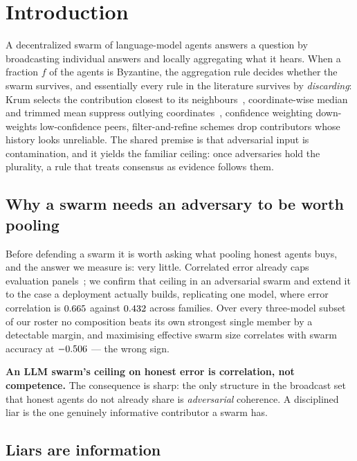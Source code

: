 \section{Introduction}
\label{sec:introduction}

A decentralized swarm of language-model agents answers a question by
broadcasting individual answers and locally aggregating what it hears. When a
fraction $f$ of the agents is Byzantine, the aggregation rule decides whether the
swarm survives, and essentially every rule in the literature survives by
\emph{discarding}: Krum selects the contribution closest to its
neighbours~\cite{blanchard2017krum}, coordinate-wise median and trimmed mean
suppress outlying coordinates~\cite{yin2018trimmed}, confidence weighting
down-weights low-confidence peers, filter-and-refine schemes drop contributors
whose history looks unreliable. The shared premise is that adversarial input is
contamination, and it yields the familiar ceiling: once adversaries hold the
plurality, a rule that treats consensus as evidence follows them.

\subsection{Why a swarm needs an adversary to be worth pooling}

Before defending a swarm it is worth asking what pooling honest agents buys, and
the answer we measure is: very little. Correlated error already caps evaluation
panels~\cite{judgecorr,panelcorr,hivemind}; we confirm that ceiling in an
adversarial swarm and extend it to the case a deployment actually builds,
replicating one model, where error correlation is $0.665$ against
$0.432$ across families. Over every three-model subset of our roster
no composition beats its own strongest single member by a detectable margin, and
maximising effective swarm size correlates with swarm accuracy at
$-0.506$ --- the wrong sign.

\textbf{An LLM swarm's ceiling on honest error is correlation, not competence.}
The consequence is sharp: the only structure in the broadcast set that honest
agents do not already share is \emph{adversarial} coherence. A disciplined liar
is the one genuinely informative contributor a swarm has.

\subsection{Liars are information}

